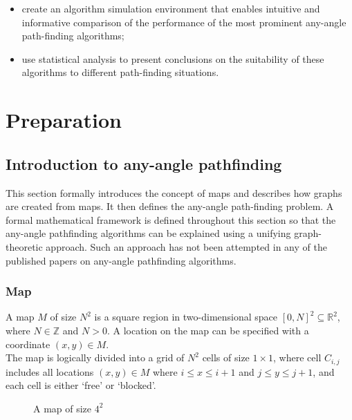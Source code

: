 \documentclass[12pt,notitlepage]{report}
\begin{document}
\begin{itemize}
\item create an algorithm simulation environment that enables intuitive and informative comparison of the performance of the most prominent any-angle path-finding algorithms;
\item use statistical analysis to present conclusions on the suitability of these algorithms to different path-finding situations.
\end {itemize}

\cleardoublepage


\chapter{Preparation} 

\section{Introduction to any-angle pathfinding}

This section formally introduces the concept of maps and describes how graphs are created from maps. It then defines the any-angle path-finding problem. A formal mathematical framework is defined throughout this section so that the any-angle pathfinding algorithms can be explained using a unifying graph-theoretic approach. Such an approach has not been attempted in any of the published papers on any-angle pathfinding algorithms.

\subsection{Map}

A map $M$ of size $N^{2}$ is a square region in two-dimensional space $[0,N]^{2} \subseteq \mathbb{R}^{2}$, where $N \in\mathbb{Z}$ and $N > 0$. A location on the map can be specified with a coordinate $(x,y) \in M$.\\

\noindent
The map is logically divided into a grid of $N^{2}$ cells of size $1 \times 1$, where cell $C_{i,j}$ includes all locations $(x,y) \in M$ where $i \leq x \leq i+1$ and $j \leq y \leq j+1$, and each cell is either `free' or `blocked'.\\

\begin{figure}
\centering
  \caption{A map of size $4^{2}$}
\end{figure}
\end{document}
